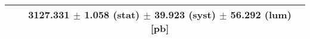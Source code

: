 \begin{tabular}{lc}
\hline
                               & 3127.331 $\pm$ 1.058 (stat) $\pm$ 39.923 (syst) $\pm$ 56.292 (lum) [pb]  \\
\hline
\end{tabular}
